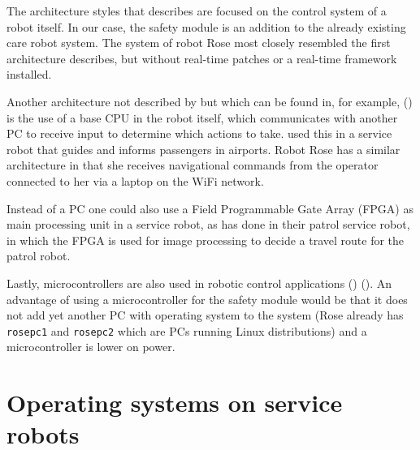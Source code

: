 \documentclass[12pt]{scrreprt}
\begin{document}
\par
The architecture styles that \citeauthor{bouchier} describes are focused on the control system of a robot itself. In our case, the safety module is an addition to the already existing care robot system. The system of robot Rose most closely resembled the first architecture \citeauthor{bouchier} describes, but without real-time patches or a real-time framework installed. %
\par
Another architecture not described by \citeauthor{bouchier} but which can be found in, for example, (\cite{spencer}) is the use of a base CPU in the robot itself, which communicates with another PC to receive input to determine which actions to take. \citeauthor{spencer} used this in a service robot that guides and informs passengers in airports. Robot Rose has a similar architecture in that she receives navigational commands from the operator connected to her via a laptop on the WiFi network. 
\par
Instead of a PC one could also use a Field Programmable Gate Array (FPGA) as main processing unit in a service robot, as \citeauthor{visual_xenomai} has done in their patrol service robot, in which the FPGA is used for image processing to decide a travel route for the patrol robot. 
\par
Lastly, microcontrollers are also used in robotic control applications (\cite{microcontroller1}) (\cite{microcontroller2}). An advantage of using a microcontroller for the safety module would be that it does not add yet another PC with operating system to the system (Rose already has \texttt{rosepc1} and \texttt{rosepc2} which are PCs running Linux distributions) and a microcontroller is lower on power.

\section{Operating systems on service robots}
\label{tOS}
\end{document}
